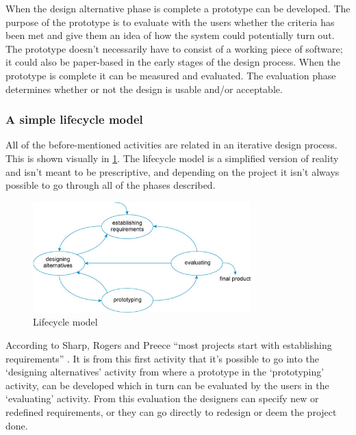 When the design alternative phase is complete a prototype can be developed.
The purpose of the prototype is to evaluate with the users whether the criteria has been met and give them an idea of how the system could potentially turn out.
The prototype doesn’t necessarily have to consist of a working piece of software;
it could also be paper-based in the early stages of the design process.
When the prototype is complete it can be measured and evaluated.
The evaluation phase determines whether or not the design is usable and/or acceptable. 

\subsubsection{A simple lifecycle model}
All of the before-mentioned activities are related in an iterative design process.
This is shown visually in \cref{fig:LifecycleModel}.
The lifecycle model is a simplified version of reality and isn’t meant to be prescriptive, and depending on the project it isn’t always possible to go through all of the phases described. 

\begin{figure}[h]
	\centering
	\includegraphics[width=0.75\textwidth]{billeder/lifecycle.png}
	\caption{Lifecycle model \citep[p.~332]{InteractionDesign}}\label{fig:LifecycleModel}
\end{figure}

According to Sharp, Rogers and Preece “most projects start with establishing requirements” \citep[p.~333]{InteractionDesign}.
It is from this first activity that it’s possible to go into the ‘designing alternatives’ activity from where a prototype in the ‘prototyping’ activity, can be developed which in turn can be evaluated by the users in the ‘evaluating’ activity.
From this evaluation the designers can specify new or redefined requirements, or they can go directly to redesign or deem the project done.
